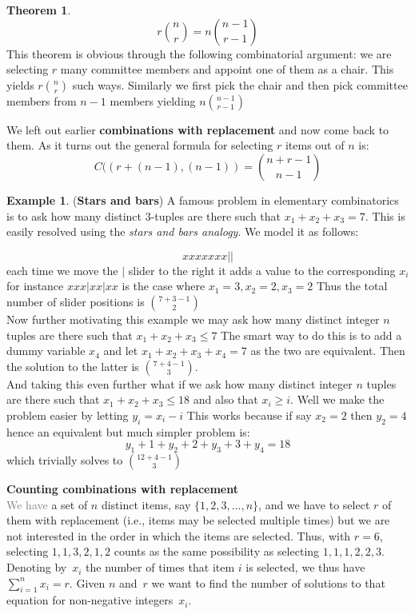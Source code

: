 \documentclass[titlepage]{article}
\theoremstyle{definition}
\newtheorem{theorem}{Theorem}[section]
\newtheorem{example}{Example}
\numberwithin{equation}{subsection}
\numberwithin{remark}{subsection}
\begin{document}
\begin{theorem}
$$ r\binom{n}{r} = n\binom{n-1}{r-1}$$
This theorem is obvious through the following combinatorial argument: we are selecting $r$ many committee members and appoint one of them as a chair. This yields $r\binom{n}{r}$ such ways. Similarly we first pick the chair and then pick committee members from $n-1$ members yielding $n\binom{n-1}{r-1}$
\end{theorem}

We left out earlier \textbf{combinations with replacement} and now come back to them. As it turns out the general formula for selecting $r$ items out of $n$ is:
$$ C((r+(n-1),(n-1)) = \binom{n+r-1}{n-1}$$

\begin{example}(\textbf{Stars and bars})
A famous problem in elementary combinatorics is to ask how many distinct 3-tuples are there such that $x_{1} + x_{2} + x_{3} = 7$. This is easily resolved using the \textit{stars and bars analogy}. We model it as follows:

$$ x x x x x x x ||$$ each time we move the $|$ slider to the right it adds a value to the corresponding $x_{i}$ for instance $x x x | x x | x x $ is the case where $x_{1} = 3, x_{2} = 2, x_{3} = 2$ Thus the total number of slider positions is $\binom{7 + 3 - 1}{2}$
\\

Now further motivating this example we may ask how many distinct integer $n$ tuples are there such that $x_{1} + x_{2} + x_{3} \leq 7$ The smart way to do this is to add a dummy variable $x_{4}$ and let $x_{1} + x_{2} + x_{3} + x_{4} = 7$ as the two are equivalent. Then the solution to the latter is $\binom{7 + 4 - 1}{3}$.
\\

And taking this even further what if we ask how many distinct integer $n$ tuples are there such that $x_{1} + x_{2} + x_{3} \leq 18$ and also that $x_{i} \geq i$. Well we make the problem easier by letting $y_{i} = x_{i} - i$ This works because if say $x_{2} = 2$ then $y_{2} = 4$ hence an equivalent but much simpler problem is:
$$ y_{1} + 1 + y_{2} + 2 + y_{3} + 3 + y_{4} = 18 $$ which trivially solves to $\binom{12 + 4-1}{3}$
\end{example}





{\bf{Counting combinations with replacement}}\\
\textcolor{gray}{We have} a set of $n$ distinct items, say $\{1,2,3,\ldots,n\}$, and we have to select $r$ of them with replacement (i.e., items may be selected multiple times) but we are not interested in the order in which the items are selected. Thus, with $r=6$, selecting $1,1,3,2,1,2$ counts as the same possibility as selecting $1,1,1,2,2,3$. Denoting by~$x_i$ the number of times that item $i$ is selected, we thus have $\sum_{i=1}^nx_i=r$. Given $n$ and~$r$ we want to find the number of solutions to that equation for non-negative integers~$x_i$.
\end{document}
